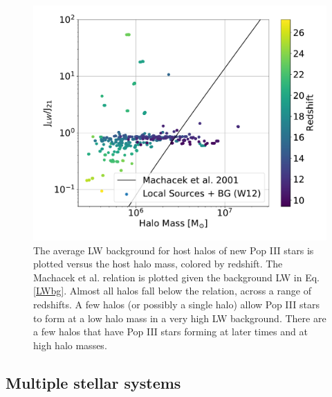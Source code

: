 \documentclass[a4paper,fleqn,usenatbib]{mnras}
\begin{document}
\begin{figure}
	\includegraphics[width=\columnwidth]{images/jlw_mass_machacek_total.pdf}
    \caption{The average LW background for host halos of new Pop III stars is plotted versus the host halo mass, colored by redshift. The Machacek et al. relation is plotted given the background LW in Eq. \ref{LWbg}. Almost all halos fall below the relation, across a range of redshifts. A few halos (or possibly a single halo) allow Pop III stars to form at a low halo mass in a very high LW background. There are a few halos that have Pop III stars forming at later times and at high halo masses.}
    \label{fig:jlw_mass_machacek}
\end{figure}

\subsection{Multiple stellar systems}
\end{document}
